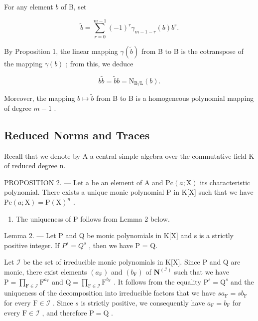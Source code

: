 For any element \(b\) of B, set

\[
\widetilde {b} = \sum_ {r = 0} ^ {m - 1} (- 1) ^ {r} \gamma_ {m - 1 - r} (b) b ^ {r}.\tag{17}
\]

By Proposition 1, the linear mapping \(\gamma (\widetilde{b})\) from B to B is the cotranspose of the mapping \(\gamma (b)\) ; from this, we deduce

\[
b \widetilde {b} = \widetilde {b} b = \mathrm{N} _ {\mathrm{B/L}} (b).\tag{18}
\]

Moreover, the mapping \(b \mapsto \widetilde{b}\) from B to B is a homogeneous polynomial mapping of degree \(m - 1\) .

\subsection{Reduced Norms and Traces}

Recall that we denote by A a central simple algebra over the commutative field K of reduced degree n.

PROPOSITION 2. --- Let a be an element of A and \(\mathrm{Pc}(a;\mathrm{X})\) its characteristic polynomial. There exists a unique monic polynomial P in K{[}X{]} such that we have \(\mathrm{Pc}(a;\mathrm{X})=\mathrm{P}(\mathrm{X})^{n}\) .

\begin{enumerate}
\def\labelenumi{\Alph{enumi})}
\tightlist
\item
  The uniqueness of P follows from Lemma 2 below.
\end{enumerate}

Lemma 2. --- Let P and Q be monic polynomials in K{[}X{]} and s is a strictly positive integer. If \(P^{s} = Q^{s}\) , then we have P = Q.

Let \(\mathcal{I}\) be the set of irreducible monic polynomials in K{[}X{]}. Since P and Q are monic, there exist elements \((a_{\mathrm{F}})\) and \((b_{\mathrm{F}})\) of \(\mathbf{N}^{(\mathcal{I})}\) such that we have \(\mathrm{P} = \prod_{\mathrm{F} \in \mathcal{I}} \mathrm{F}^{a_{\mathrm{F}}}\) and \(\mathrm{Q} = \prod_{\mathrm{F} \in \mathcal{I}} \mathrm{F}^{b_{\mathrm{F}}}\) . It follows from the equality \(\mathrm{P}^s = \mathrm{Q}^s\) and the uniqueness of the decomposition into irreducible factors that we have \(sa_{\mathrm{F}} = sb_{\mathrm{F}}\) for every \(\mathrm{F} \in \mathcal{I}\) . Since \(s\) is strictly positive, we consequently have \(a_{\mathrm{F}} = b_{\mathrm{F}}\) for every \(\mathrm{F} \in \mathcal{I}\) , and therefore \(\mathrm{P} = \mathrm{Q}\) .

